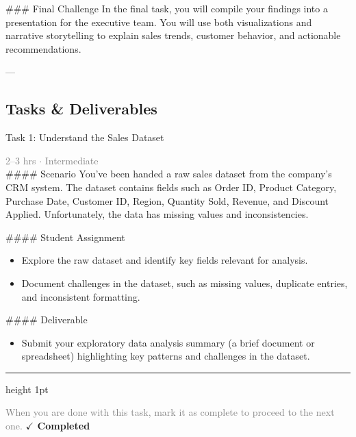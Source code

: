 \documentclass[10pt,a4paper]{article}
\begin{document}
\#\#\# Final Challenge  
In the final task, you will compile your findings into a presentation for the executive team. You will use both visualizations and narrative storytelling to explain sales trends, customer behavior, and actionable recommendations.

---

\subsection*{Tasks \& Deliverables}

\begin{taskbox}{Task 1: Understand the Sales Dataset}

    {\small \textcolor{gray}{2--3 hrs $\cdot$ Intermediate}}\\[12pt]

    \#\#\#\# Scenario  
You’ve been handed a raw sales dataset from the company’s CRM system. The dataset contains fields such as Order ID, Product Category, Purchase Date, Customer ID, Region, Quantity Sold, Revenue, and Discount Applied. Unfortunately, the data has missing values and inconsistencies.  

\#\#\#\# Student Assignment  
\begin{itemize}
    \item Explore the raw dataset and identify key fields relevant for analysis.  
    \item Document challenges in the dataset, such as missing values, duplicate entries, and inconsistent formatting.  
\end{itemize}

\#\#\#\# Deliverable  
\begin{itemize}
    \item Submit your exploratory data analysis summary (a brief document or spreadsheet) highlighting key patterns and challenges in the dataset.\par
\end{itemize}

    \vspace{16pt}

    \textcolor{cardBorder}{\hrule height 1pt}\vspace{8pt}

    \small \textcolor{gray}{When you are done with this task, mark it as complete to proceed to the next one.} \hfill \textbf{\textcolor{brandDark}{$\checkmark$ Completed}}

\end{taskbox}
\end{document}

